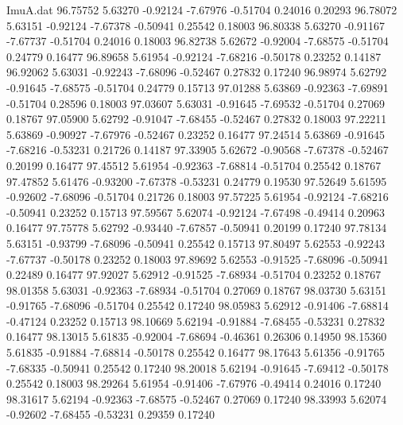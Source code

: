\begin{filecontents}{ImuA.dat}
  96.75752    5.63270   -0.92124   -7.67976   -0.51704    0.24016    0.20293
  96.78072    5.63151   -0.92124   -7.67378   -0.50941    0.25542    0.18003
  96.80338    5.63270   -0.91167   -7.67737   -0.51704    0.24016    0.18003
  96.82738    5.62672   -0.92004   -7.68575   -0.51704    0.24779    0.16477
  96.89658    5.61954   -0.92124   -7.68216   -0.50178    0.23252    0.14187
  96.92062    5.63031   -0.92243   -7.68096   -0.52467    0.27832    0.17240
  96.98974    5.62792   -0.91645   -7.68575   -0.51704    0.24779    0.15713
  97.01288    5.63869   -0.92363   -7.69891   -0.51704    0.28596    0.18003
  97.03607    5.63031   -0.91645   -7.69532   -0.51704    0.27069    0.18767
  97.05900    5.62792   -0.91047   -7.68455   -0.52467    0.27832    0.18003
  97.22211    5.63869   -0.90927   -7.67976   -0.52467    0.23252    0.16477
  97.24514    5.63869   -0.91645   -7.68216   -0.53231    0.21726    0.14187
  97.33905    5.62672   -0.90568   -7.67378   -0.52467    0.20199    0.16477
  97.45512    5.61954   -0.92363   -7.68814   -0.51704    0.25542    0.18767
  97.47852    5.61476   -0.93200   -7.67378   -0.53231    0.24779    0.19530
  97.52649    5.61595   -0.92602   -7.68096   -0.51704    0.21726    0.18003
  97.57225    5.61954   -0.92124   -7.68216   -0.50941    0.23252    0.15713
  97.59567    5.62074   -0.92124   -7.67498   -0.49414    0.20963    0.16477
  97.75778    5.62792   -0.93440   -7.67857   -0.50941    0.20199    0.17240
  97.78134    5.63151   -0.93799   -7.68096   -0.50941    0.25542    0.15713
  97.80497    5.62553   -0.92243   -7.67737   -0.50178    0.23252    0.18003
  97.89692    5.62553   -0.91525   -7.68096   -0.50941    0.22489    0.16477
  97.92027    5.62912   -0.91525   -7.68934   -0.51704    0.23252    0.18767
  98.01358    5.63031   -0.92363   -7.68934   -0.51704    0.27069    0.18767
  98.03730    5.63151   -0.91765   -7.68096   -0.51704    0.25542    0.17240
  98.05983    5.62912   -0.91406   -7.68814   -0.47124    0.23252    0.15713
  98.10669    5.62194   -0.91884   -7.68455   -0.53231    0.27832    0.16477
  98.13015    5.61835   -0.92004   -7.68694   -0.46361    0.26306    0.14950
  98.15360    5.61835   -0.91884   -7.68814   -0.50178    0.25542    0.16477
  98.17643    5.61356   -0.91765   -7.68335   -0.50941    0.25542    0.17240
  98.20018    5.62194   -0.91645   -7.69412   -0.50178    0.25542    0.18003
  98.29264    5.61954   -0.91406   -7.67976   -0.49414    0.24016    0.17240
  98.31617    5.62194   -0.92363   -7.68575   -0.52467    0.27069    0.17240
  98.33993    5.62074   -0.92602   -7.68455   -0.53231    0.29359    0.17240

\end{filecontents}
